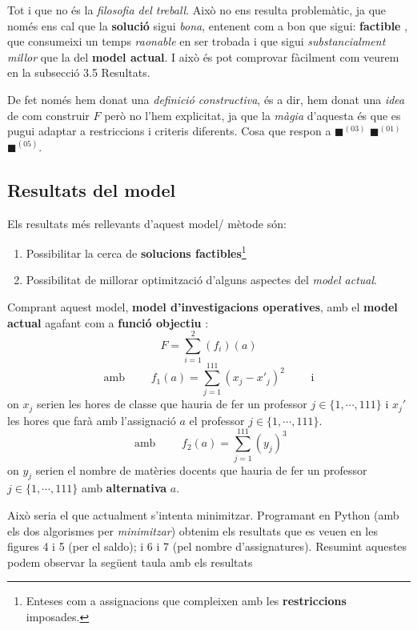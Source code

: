 \documentclass[10pt,twocolumn]{article}
\begin{document}
Tot i que no és la \textit{filosofia del treball}. Això no ens resulta problemàtic, ja que només ens cal que la \textbf{solució} sigui \textit{bona}, entenent com a bon que sigui: \textbf{factible} , que consumeixi un temps \textit{raonable} en ser trobada i que sigui \textit{substancialment millor} que la del \textbf{model actual}. I això és pot comprovar fàcilment com veurem en la subsecció 3.5 Resultats.

De fet només hem donat una \textit{definició constructiva}, és a dir, hem donat una \textit{idea} de com construir $F$ però no l'hem explicitat, ja que la \textit{màgia} d'aquesta és que es pugui adaptar a restriccions i criteris diferents. Cosa que respon a  {\color{green!60}$\blacksquare$}$^{(03)}$ {\color{cyan!60}$\blacksquare$}$^{(01)}${\color{violet!60}$\blacksquare$}$^{(05)}$.
\subsection{Resultats del model}
Els resultats més rellevants d'aquest model/ mètode són:
\begin{enumerate}
	\item Possibilitar la cerca de \textbf{solucions factibles}\footnote{Enteses com a assignacions que compleixen amb les \textbf{restriccions} imposades. }
	\item Possibilitat de millorar optimització d'alguns aspectes del \textit{model actual}.
\end{enumerate}
Comprant aquest model, \textbf{model d'investigacions operatives}, amb el \textbf{model actual} agafant com a \textbf{funció objectiu} :
$$
F=\sum_{i=1}^{2}(f_i)(a) 
$$
$$\text{ amb } \qquad f_1(a)=\sum_{j=1}^{111} (x_j-x'_j)^2 \qquad \text{ i }$$  
on $x_j$ serien les hores de classe que hauria de fer un professor $j \in \{1,\cdots,111\}$ i $x_j'$ les hores que farà amb l'assignació $a$ el professor $j \in \{1,\cdots,111\}$.
$$\text{ amb }  \qquad f_2(a)=\sum_{j=1}^{111} (y_j)^3$$
on $y_j$ serien el nombre de matèries docents que hauria de fer un professor $j \in \{1,\cdots,111\}$   amb \textbf{alternativa} $a$. 

Això seria el que actualment s'intenta minimitzar. Programant en Python (amb els dos algorismes per \textit{minimitzar}) obtenim els resultats que es veuen en les figures 4 i 5 (per el saldo); i 6 i 7 (pel nombre d'assignatures).
Resumint aquestes podem observar la següent taula amb els resultats
\vspace{3mm}
\end{document}

